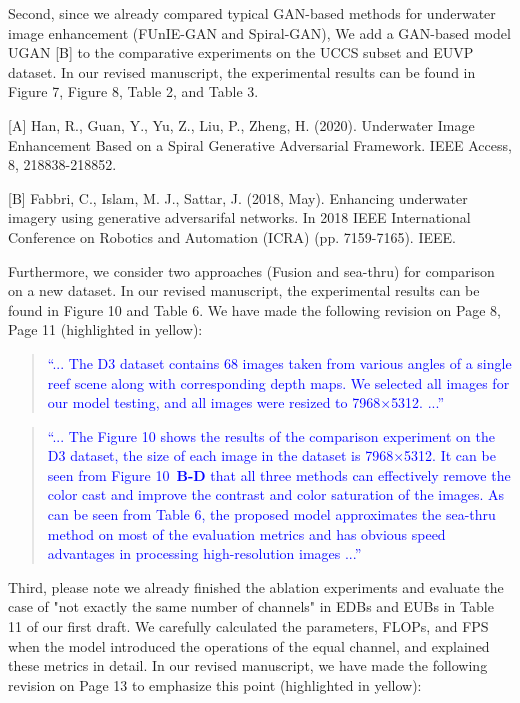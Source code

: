 \documentclass[a4paper,twoside,10pt]{reviewresponse}
\newcommand\tgray[1]{\textcolor{blue}{#1}}
\begin{document}
Second, since we already compared typical GAN-based methods for underwater image enhancement (FUnIE-GAN and Spiral-GAN), We add a GAN-based model UGAN [B] to the comparative experiments on the UCCS subset and EUVP dataset. In our revised manuscript, the experimental results can be found in Figure 7, Figure 8, Table 2, and Table 3.

[A] Han, R., Guan, Y., Yu, Z., Liu, P.,  Zheng, H. (2020). Underwater Image Enhancement Based on a Spiral Generative Adversarial Framework. IEEE Access, 8, 218838-218852.

[B] Fabbri, C., Islam, M. J., Sattar, J. (2018, May). Enhancing underwater imagery using generative adversarifal networks. In 2018 IEEE International Conference on Robotics and Automation (ICRA) (pp. 7159-7165). IEEE.

Furthermore, we consider two approaches (Fusion and sea-thru) for comparison on a new dataset. In our revised manuscript, the experimental results can be found in Figure 10 and Table 6. We have made the following revision on Page 8, Page 11 (highlighted in yellow):
\begin{quotation}
	\tgray{
		``... The D3 dataset contains 68 images taken from various angles of a single reef scene along with corresponding depth maps. We selected all images for our model testing, and all images were resized to 7968$\times$5312. ...''
}
\end{quotation}

\begin{quotation}
	\tgray{
		``... The Figure 10 shows the results of the comparison experiment on the D3 dataset, the size of each image in the dataset is 7968$\times$5312. It can be seen from Figure 10~\textbf{B-D} that all three methods can effectively remove the color cast and improve the contrast and color saturation of the images. As can be seen from Table 6, the proposed model approximates the sea-thru method on most of the evaluation metrics and has obvious speed advantages in processing high-resolution images ...''
}
\end{quotation}


Third, please note we already finished the ablation experiments and evaluate the case of "not exactly the same number of channels" in EDBs and EUBs in Table 11 of our first draft. We carefully calculated the parameters, FLOPs, and FPS when the model introduced the operations of the equal channel, and explained these metrics in detail. In our revised manuscript, we have made the following revision on Page 13 to emphasize this point (highlighted in yellow):
\end{document}
